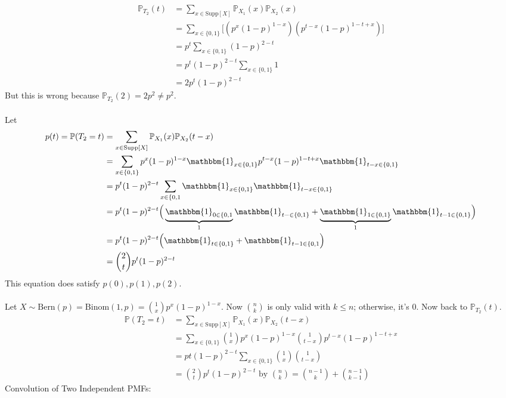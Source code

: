 \documentclass[12pt]{article}
\newcommand{\prob}[1]{\mathbb{P}(#1)}
\newcommand{\probsub}[2]{\mathbb{P}_{#1}(#2)}
\newcommand{\indicator}[1]{\mathbbm{1}_{#1}}
\begin{document}
$$ \begin{aligned} \probsub{T_2}{t} &= \sum_{x \in \text{Supp}[X]} \probsub{X_1}{x} \probsub{X_2}{x} \\ &= \sum_{x \in \{0, 1\}} \Big[(p^x(1-p)^{1 - x})(p^{t - x}(1 - p)^{1 - t + x})\Big] \\ &= p^t \sum_{x \in \{0, 1\}} (1 - p)^{2 - t} \\ &= p^t (1 - p)^{2- t} \sum_{x \in \{0, 1\}} 1 \\ &= 2p^t(1 - p)^{2 - t} \end{aligned} $$ But this is wrong because $\probsub{T_2}{2} = 2p^2 \neq p^2$. \\~\\
Let $$ \begin{aligned} p(t) = \prob{T_2 = t} &= \sum_{x \in \text{Supp}[X]} \probsub{X_1}{x}\probsub{X_2}{t - x} \\ &= \sum_{x \in \{0, 1\}} p^x(1 - p)^{1 - x} \indicator{x \in \{0, 1\}} p^{t - x}(1 - p)^{1 - t + x} \indicator{t - x \in \{0, 1\}} \\ &= p^t(1 - p)^{2 - t} \sum_{x \in \{0, 1} \indicator{x \in \{0, 1\}} \indicator{t - x \in \{0, 1\}} \\ &= p^t(1 - p)^{2 - t}\Big(\underbrace{\indicator{0 \in \{0, 1}}_{1}\indicator{t - \in \{0, 1\}} + \underbrace{\indicator{1 \in \{0, 1\}}}_{1}\indicator{t - 1 \in \{0, 1\}}\Big) \\ &= p^t (1 - p)^{2 - t} \Big(\indicator{t \in \{0, 1\}} + \indicator{t - 1 \in \{0, 1}\Big) \\ &= \binom{2}{t}p^t(1 - p)^{2 - t} \end{aligned} $$ 
This equation does satisfy $p(0), p(1), p(2)$. \\~\\
Let $X \sim \text{Bern}(p) = \text{Binom}(1, p) = \binom{1}{x}p^x(1 - p)^{1 - x}$. Now $\binom{n}{k}$ is only valid with $k \leq n$; otherwise, it's 0. Now back to $\probsub{T_2}{t}$. 
$$\begin{aligned} \prob{T_2 = t} &= \sum_{x \in \text{Supp}[X]} \probsub{X_1}{x}\probsub{X_2}{t - x} \\ &= \sum_{x \in \{0, 1\}} \binom{1}{x}p^x(1 - p)^{1- x} \binom{1}{t - x}p^{t - x}(1 - p)^{1 - t + x} \\ &= pt(1 - p)^{2 - t}\sum_{x \in \{0, 1\}} \binom{1}{x}\binom{1}{t - x} \\ &= \binom{2}{t}p^t(1 - p)^{2 - t} \text{ by } \binom{n}{k} = \binom{n - 1}{k}+ \binom{n - 1}{k - 1} \end{aligned} $$ 
Convolution of Two Independent PMFs: 
\end{document}
